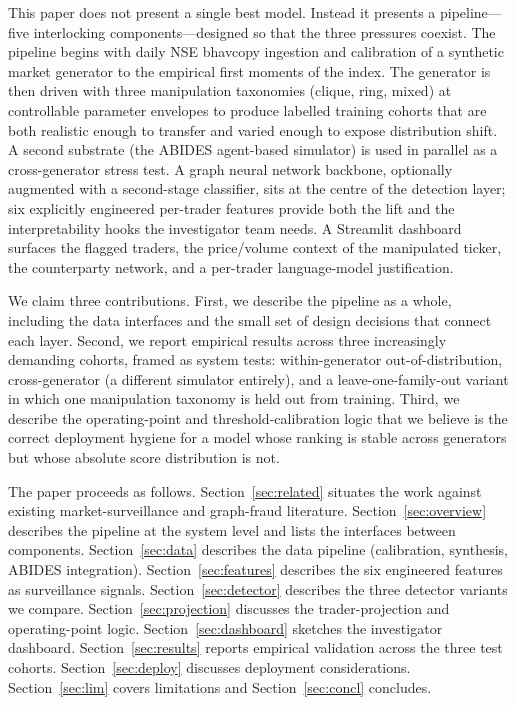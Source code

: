 \documentclass[10pt,twocolumn,letterpaper]{article}
\begin{document}
This paper does not present a single best model. Instead it presents a
pipeline---five interlocking components---designed so that the three
pressures coexist. The pipeline begins with daily NSE bhavcopy
ingestion and calibration of a synthetic market generator to the
empirical first moments of the index. The generator is then driven
with three manipulation taxonomies (clique, ring, mixed) at controllable
parameter envelopes to produce labelled training cohorts that are both
realistic enough to transfer and varied enough to expose distribution
shift. A second substrate (the ABIDES agent-based simulator) is used in
parallel as a cross-generator stress test. A graph neural network
backbone, optionally augmented with a second-stage classifier, sits at
the centre of the detection layer; six explicitly engineered per-trader
features provide both the lift and the interpretability hooks the
investigator team needs. A Streamlit dashboard surfaces the flagged
traders, the price/volume context of the manipulated ticker, the
counterparty network, and a per-trader language-model justification.

We claim three contributions. First, we describe the pipeline as a
whole, including the data interfaces and the small set of design
decisions that connect each layer. Second, we report empirical results
across three increasingly demanding cohorts, framed as system tests:
within-generator out-of-distribution, cross-generator (a different
simulator entirely), and a leave-one-family-out variant in which one
manipulation taxonomy is held out from training. Third, we describe the
operating-point and threshold-calibration logic that we believe is the
correct deployment hygiene for a model whose ranking is stable across
generators but whose absolute score distribution is not.

The paper proceeds as follows. Section~\ref{sec:related} situates the
work against existing market-surveillance and graph-fraud literature.
Section~\ref{sec:overview} describes the pipeline at the system level
and lists the interfaces between components. Section~\ref{sec:data}
describes the data pipeline (calibration, synthesis, ABIDES
integration). Section~\ref{sec:features} describes the six engineered
features as surveillance signals. Section~\ref{sec:detector} describes
the three detector variants we compare. Section~\ref{sec:projection}
discusses the trader-projection and operating-point logic.
Section~\ref{sec:dashboard} sketches the investigator dashboard.
Section~\ref{sec:results} reports empirical validation across the three
test cohorts. Section~\ref{sec:deploy} discusses deployment
considerations. Section~\ref{sec:lim} covers limitations and
Section~\ref{sec:concl} concludes.
\end{document}
